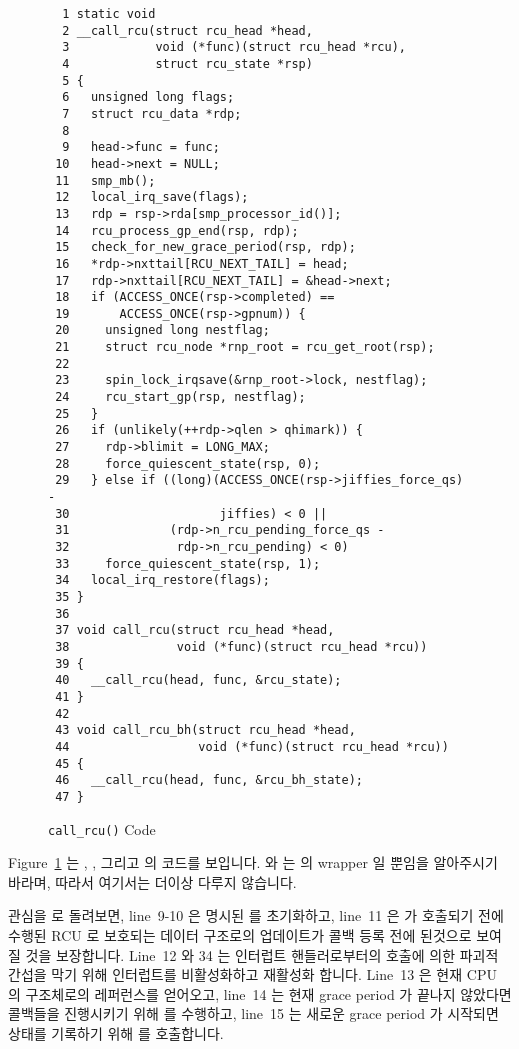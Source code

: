 \begin{figure}[tbp]
{ \scriptsize
\begin{verbatim}
  1 static void
  2 __call_rcu(struct rcu_head *head,
  3            void (*func)(struct rcu_head *rcu),
  4            struct rcu_state *rsp)
  5 {
  6   unsigned long flags;
  7   struct rcu_data *rdp;
  8
  9   head->func = func;
 10   head->next = NULL;
 11   smp_mb();
 12   local_irq_save(flags);
 13   rdp = rsp->rda[smp_processor_id()];
 14   rcu_process_gp_end(rsp, rdp);
 15   check_for_new_grace_period(rsp, rdp);
 16   *rdp->nxttail[RCU_NEXT_TAIL] = head;
 17   rdp->nxttail[RCU_NEXT_TAIL] = &head->next;
 18   if (ACCESS_ONCE(rsp->completed) ==
 19       ACCESS_ONCE(rsp->gpnum)) {
 20     unsigned long nestflag;
 21     struct rcu_node *rnp_root = rcu_get_root(rsp);
 22
 23     spin_lock_irqsave(&rnp_root->lock, nestflag);
 24     rcu_start_gp(rsp, nestflag);
 25   }
 26   if (unlikely(++rdp->qlen > qhimark)) {
 27     rdp->blimit = LONG_MAX;
 28     force_quiescent_state(rsp, 0);
 29   } else if ((long)(ACCESS_ONCE(rsp->jiffies_force_qs) -
 30                     jiffies) < 0 ||
 31              (rdp->n_rcu_pending_force_qs -
 32               rdp->n_rcu_pending) < 0)
 33     force_quiescent_state(rsp, 1);
 34   local_irq_restore(flags);
 35 }
 36
 37 void call_rcu(struct rcu_head *head,
 38               void (*func)(struct rcu_head *rcu))
 39 {
 40   __call_rcu(head, func, &rcu_state);
 41 }
 42
 43 void call_rcu_bh(struct rcu_head *head,
 44                  void (*func)(struct rcu_head *rcu))
 45 {
 46   __call_rcu(head, func, &rcu_bh_state);
 47 }
\end{verbatim}
}
\caption{{\tt call\_rcu()} Code}
\label{fig:app:rcuimpl:rcutreewt:Code for rcutree call-rcu}
\end{figure}

Figure~\ref{fig:app:rcuimpl:rcutreewt:Code for rcutree call-rcu}
는 , , 그리고
 의 코드를 보입니다.
 와  는  의 wrapper 일 뿐임을
알아주시기 바라며, 따라서 여기서는 더이상 다루지 않습니다.

관심을  로 돌려보면, line~9-10 은 명시된  를
초기화하고, line~11 은  가 호출되기 전에 수행된 RCU 로
보호되는 데이터 구조로의 업데이트가 콜백 등록 전에 된것으로 보여질 것을
보장합니다.
Line~12 와 34 는 인터럽트 핸들러로부터의  호출에 의한 파괴적
간섭을 막기 위해 인터럽트를 비활성화하고 재활성화 합니다.
Line~13 은 현재 CPU 의  구조체로의 레퍼런스를 얻어오고, line~14 는
현재 grace period 가 끝나지 않았다면 콜백들을 진행시키기 위해
 를 수행하고, line~15 는 새로운 grace period 가
시작되면 상태를 기록하기 위해  를 호출합니다.
\iffalse

